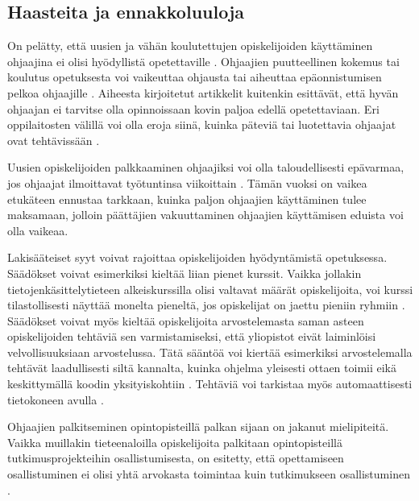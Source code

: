 \documentclass[finnish]{tktltiki2}
\theoremstyle{definition}
\theoremstyle{remark}
\begin{document}
\subsection{Haasteita ja ennakkoluuloja}
On pelätty, että uusien ja vähän koulutettujen opiskelijoiden käyttäminen ohjaajina ei olisi hyödyllistä opetettaville \cite{Harper02}. Ohjaajien puutteellinen kokemus tai koulutus opetuksesta voi vaikeuttaa ohjausta tai aiheuttaa epäonnistumisen pelkoa ohjaajille \cite{Mark11}. Aiheesta kirjoitetut artikkelit kuitenkin esittävät, että hyvän ohjaajan ei tarvitse olla opinnoissaan kovin paljoa edellä opetettaviaan. Eri oppilaitosten välillä voi olla eroja siinä, kuinka päteviä tai luotettavia ohjaajat ovat tehtävissään \cite{Reges03}. \par

Uusien opiskelijoiden palkkaaminen ohjaajiksi voi olla taloudellisesti epävarmaa, jos ohjaajat ilmoittavat työtuntinsa viikoittain \cite{Reges03}. Tämän vuoksi on vaikea etukäteen ennustaa tarkkaan, kuinka paljon ohjaajien käyttäminen tulee maksamaan, jolloin päättäjien vakuuttaminen ohjaajien käyttämisen eduista voi olla vaikeaa. \par

Lakisääteiset syyt voivat rajoittaa opiskelijoiden hyödyntämistä opetuksessa. Säädökset voivat esimerkiksi kieltää liian pienet kurssit. Vaikka jollakin tietojenkäsittelytieteen alkeiskurssilla olisi valtavat määrät opiskelijoita, voi kurssi tilastollisesti näyttää monelta pieneltä, jos opiskelijat on jaettu pieniin ryhmiin \cite{Reges03}. Säädökset voivat myös kieltää opiskelijoita arvostelemasta saman asteen opiskelijoiden tehtäviä sen varmistamiseksi, että yliopistot eivät laiminlöisi velvollisuuksiaan arvostelussa. Tätä sääntöä voi kiertää esimerkiksi arvostelemalla tehtävät laadullisesti siltä kannalta, kuinka ohjelma yleisesti ottaen toimii eikä keskittymällä koodin yksityiskohtiin \cite{Dickson11}. Tehtäviä voi tarkistaa myös automaattisesti tietokoneen avulla \cite{Vihavainen}. \par

Ohjaajien palkitseminen opintopisteillä palkan sijaan on jakanut mielipiteitä. Vaikka muillakin tieteenaloilla opiskelijoita palkitaan opintopisteillä tutkimusprojekteihin osallistumisesta, on esitetty, että opettamiseen osallistuminen ei olisi yhtä arvokasta toimintaa kuin tutkimukseen osallistuminen \cite{Reges88}. \par
\end{document}
